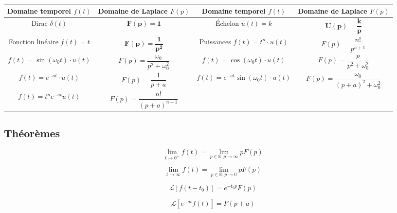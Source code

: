 \begin{table*}[H]
\centering
\begin{tabular}{|c|c||c|c|}
\hline
Domaine temporel $f(t)$ & Domaine de Laplace $F(p)$ & 
Domaine temporel $f(t)$ & Domaine de Laplace $F(p)$ \\
\hline
\hline
Dirac $\delta(t)$ &
$\mathbf{F(p)=1}$ &
Échelon $ u(t)=k $&
$ \mathbf{U(p) = \dfrac{k}{p}}$
\\
\hline
Fonction linéaire $f(t)=t$& 
$\mathbf{F(p) =\dfrac{1}{p^2} }$ &
Puissances
$f(t) = t^n\cdot u(t)$ &
$F(p)=\dfrac{n!}{p^{n+1}} $
\\
\hline
$f(t) = \sin \left( \omega_0 t\right) \cdot u(t)$ &
$F(p) = \dfrac{\omega_0}{p^2+\omega_0^2} $ &
$f(t) = \cos \left( \omega_0 t\right) \cdot u(t)$ & 
$F(p) = \dfrac{p}{p^2+\omega_0^2} $ \\
\hline
$f(t)= e^{-at}\cdot u(t)$ & 
$F(p)= \dfrac{1}{p+a}$ &
$f(t) = e^{-at}\sin\left( \omega_0 t\right) \cdot u(t)$ &
$F(p)=\dfrac{\omega_0}{\left( p+a\right)^2 + \omega_0^2}$  \\
\hline
$f(t)=t^ne^{-at}u(t)$ & $F(p)=\dfrac{n!}{\left( p+a\right)^{n+1}}$
& &
\\
\hline
\end{tabular}
\end{table*}


\subsection{Théorèmes}

\begin{multicols}{2}
\begin{theoreme}
$$ \lim\limits_{t \to 0^+} f(t) = \lim\limits_{p\in\mathbb{R}, p \to \infty} pF(p)$$
\end{theoreme} 

\begin{theoreme}
$$\lim\limits_{t \to \infty} f(t) = \lim\limits_{p\in\mathbb{R}, p \to 0} pF(p)$$
\end{theoreme} 

\begin{theoreme}[Retard]
$$\mathcal{L}\left[ f\left(t-t_0\right) \right] = e^{-t_0 p}F(p)$$
\end{theoreme} 

\begin{theoreme}[Amortissement]
$$\mathcal{L} \left[ e^{-a t} f\left(t\right) \right] = F(p+a)$$
\end{theoreme} 
\end{multicols}





